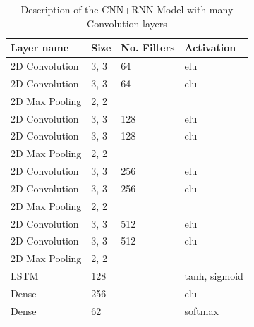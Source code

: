 \documentclass[12pt]{article}
\theoremstyle{definition}
\begin{document}
	\begin{table}[ht]
		\centering
		\renewcommand{\arraystretch}{1.35}

		\caption{Description of the CNN+RNN Model with many Convolution layers}
		\label{table:big-CNN-LSTM}

		\begin{tabularx}{\textwidth}{XXXX}
			\textbf{Layer name} & \textbf{Size} & \textbf{No. Filters} & \textbf{Activation} \\ \hline
			2D Convolution & 3, 3 & 64                   & elu                  \\ \hline
			2D Convolution & 3, 3 & 64                   & elu                  \\ \hline
			2D Max Pooling & 2, 2 & \textbf{\textendash} & \textbf{\textendash} \\ \hline
			2D Convolution & 3, 3 & 128                  & elu                  \\ \hline
			2D Convolution & 3, 3 & 128                  & elu                  \\ \hline
			2D Max Pooling & 2, 2 & \textbf{\textendash} & \textbf{\textendash} \\ \hline
			2D Convolution & 3, 3 & 256                  & elu                  \\ \hline
			2D Convolution & 3, 3 & 256                  & elu                  \\ \hline
			2D Max Pooling & 2, 2 & \textbf{\textendash} & \textbf{\textendash} \\ \hline
			2D Convolution & 3, 3 & 512                  & elu                  \\ \hline
			2D Convolution & 3, 3 & 512                  & elu                  \\ \hline
			2D Max Pooling & 2, 2 & \textbf{\textendash} & \textbf{\textendash} \\ \hline
			LSTM           & 128  & \textbf{\textendash} & tanh, sigmoid        \\ \hline
			Dense          & 256  & \textbf{\textendash} & elu                  \\ \hline
			Dense          & 62   & \textbf{\textendash} & softmax              \\
		\end{tabularx}
	\end{table}
\end{document}
